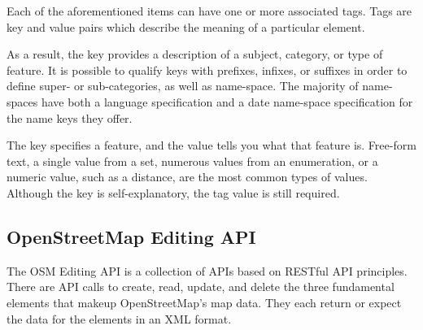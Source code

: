 Each of the aforementioned items can have one or more associated tags. Tags are key and value pairs which describe the meaning of a particular element. 

As a result, the key provides a description of a subject, category, or type of feature. It is possible to qualify keys with prefixes, infixes, or suffixes in order to define super- or sub-categories, as well as name-space. The majority of name-spaces have both a language specification and a date name-space specification for the name keys they offer. 



The key specifies a feature, and the value tells you what that feature is.
Free-form text, a single value from a set, numerous values from an enumeration, or a numeric value, such as a distance, are the most common types of values.
Although the key is self-explanatory, the tag value is still required. 












\subsection{OpenStreetMap Editing API}

The OSM Editing API is a collection of APIs based on RESTful API principles. There are API calls to create, read, update, and delete the three fundamental elements that makeup OpenStreetMap's map data. They each return or expect the data for the elements in an XML format.
\autocite[]{wiki:api}

